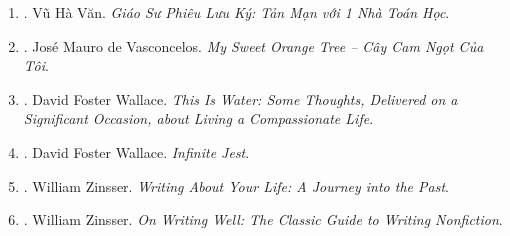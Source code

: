 \documentclass{article}
\begin{document}
\begin{enumerate}
	\item \cite{VanVu2022}. Vũ Hà Văn. \textit{Giáo Sư Phiêu Lưu Ký: Tản Mạn với 1 Nhà Toán Học}.\hfill{\sf[finished]}
	\item \cite{Vasconcelos_orange_tree}. Jos\'e Mauro de Vasconcelos. \textit{My Sweet Orange Tree -- Cây Cam Ngọt Của Tôi}.\hfill{\sf[finished]}
	\item \cite{Wallace2009}. David Foster Wallace. \textit{This Is Water: Some Thoughts, Delivered on a Significant Occasion, about Living a Compassionate Life}.\hfill{\sf[finished]}
	\item \cite{Wallace2011}. David Foster Wallace. \textit{Infinite Jest}.\hfill{\sf[reading]}
	\item \cite{Zinsser2005}. William Zinsser. \textit{Writing About Your Life: A Journey into the Past}.
	\item \cite{Zinsser2016}. William Zinsser. \textit{On Writing Well: The Classic Guide to Writing Nonfiction}.\hfill{\sf[reading]}
\end{enumerate}

\end{document}
